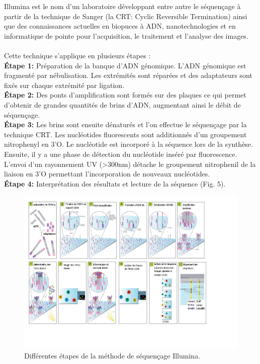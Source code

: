 Illumina est le nom d'un laboratoire développant entre autre le séquençage à partir de la technique de Sanger (la CRT: Cyclic Reversible Termination) ainsi que des connaissances actuelles en biopuces à ADN, nanotechnologies et en informatique de pointe pour l'acquisition, le traitement et l'analyse des images.
~~\\
Cette technique s'applique en plusieurs étapes :
~~\\
\textbf{Étape 1:}
Préparation de la banque d'ADN génomique.
L'ADN génomique est fragmenté par nébulisation. Les extrémités sont réparées et des adaptateurs sont fixés sur chaque extrémité par ligation.
~~\\
\textbf{Étape 2:}
Des ponts d'amplification sont formés sur des plaques ce qui permet d'obtenir de grandes quantités de brins d'ADN, augmentant ainsi le débit de séquençage.
~~\\
\textbf{Étape 3:}
Les brins sont ensuite dénaturés et l'on effectue le séquençage par la technique CRT. 
Les nucléotides fluorescents sont additionnés d'un groupement nitrophenyl en 3'O.
Le nucléotide est incorporé à la séquence lors de la synthèse.
Ensuite, il y a une phase de détection du nucléotide inséré par fluorescence.
L'envoi d'un rayonnement UV (>300nm) détache le groupement nitrophenil de la liaison en 3'O permettant l'incorporation de nouveaux nucléotides.
~~\\
\textbf{Étape 4:}
Interprétation des résultats et lecture de la séquence (Fig. 5).
\begin{figure}[!h]
 \centering
\includegraphics[scale=0.6]{Images/sequfr1.png}
\caption{Différentes étapes de la méthode de séquençage Illumina.}
\end{figure}
~~\\
